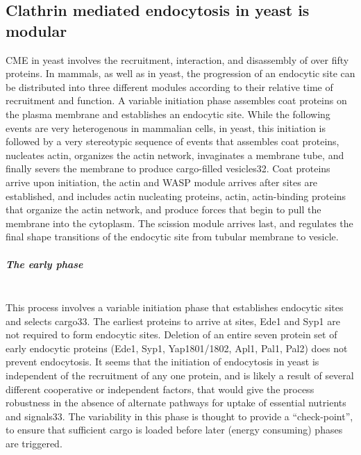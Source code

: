 		\subsection{Clathrin mediated endocytosis in yeast is modular}
		CME in yeast involves the recruitment, interaction, and disassembly of over fifty proteins. In mammals, as well as in yeast, the progression of an endocytic site can be distributed into three different modules according to their relative time of recruitment and function. A variable initiation phase assembles coat proteins on the plasma membrane and establishes an endocytic site. While the following events are very heterogenous in mammalian cells, in yeast, this initiation is followed by a very stereotypic sequence of events that assembles coat proteins, nucleates actin, organizes the actin network, invaginates a membrane tube, and finally severs the membrane to produce cargo-filled vesicles32. Coat proteins arrive upon initiation, the actin and WASP module arrives after sites are established, and includes actin nucleating proteins, actin, actin-binding proteins that organize the actin network, and produce forces that begin to pull the membrane into the cytoplasm. The scission module arrives last, and regulates the final shape transitions of the endocytic site from tubular membrane to vesicle. 


			\subparagraph{The early phase}
			\mbox{} \\
			This process involves a variable initiation phase that establishes endocytic sites and selects cargo33. The earliest proteins to arrive at sites, Ede1 and Syp1 are not required to form endocytic sites. Deletion of an entire seven protein set of early endocytic proteins (Ede1, Syp1, Yap1801/1802, Apl1, Pal1, Pal2) does not prevent endocytosis. It seems that the initiation of endocytosis in yeast is independent of the recruitment of any one protein, and is likely a result of several different cooperative or independent factors, that would give the process robustness in the absence of alternate pathways for uptake of essential nutrients and signals33. The variability in this phase is thought to provide a “check-point”, to ensure that sufficient cargo is loaded before later (energy consuming) phases are triggered. 
			
